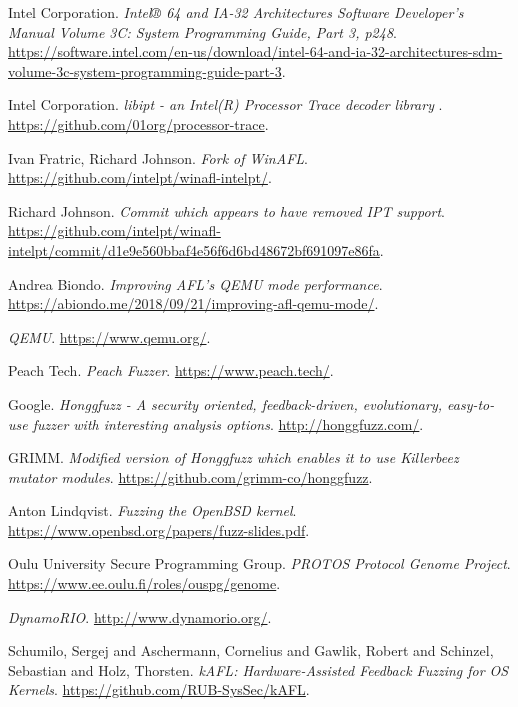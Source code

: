 \begin{thebibliography}{99}
  Intel Corporation.
  \textit{Intel® 64 and IA-32 Architectures Software Developer's Manual Volume 3C: System Programming Guide, Part 3, p248}.
  \url{https://software.intel.com/en-us/download/intel-64-and-ia-32-architectures-sdm-volume-3c-system-programming-guide-part-3}.

  Intel Corporation.
  \textit{libipt - an Intel(R) Processor Trace decoder library }.
  \url{https://github.com/01org/processor-trace}.

  Ivan Fratric, Richard Johnson.
  \textit{Fork of WinAFL}.
  \url{https://github.com/intelpt/winafl-intelpt/}.

  Richard Johnson.
  \textit{Commit which appears to have removed IPT support}.
  \url{https://github.com/intelpt/winafl-intelpt/commit/d1e9e560bbaf4e56f6d6bd48672bf691097e86fa}.

  Andrea Biondo.
  \textit{Improving AFL's QEMU mode performance}.
  \url{https://abiondo.me/2018/09/21/improving-afl-qemu-mode/}.

  \textit{QEMU}.
  \url{https://www.qemu.org/}.

  Peach Tech.
  \textit{Peach Fuzzer}.
  \url{https://www.peach.tech/}.

  Google.
  \textit{Honggfuzz - A security oriented, feedback-driven, evolutionary, easy-to-use fuzzer with interesting analysis options}.
  \url{http://honggfuzz.com/}.

  GRIMM.
  \textit{Modified version of Honggfuzz which enables it to use Killerbeez mutator modules}.
  \url{https://github.com/grimm-co/honggfuzz}.

  Anton Lindqvist.
  \textit{Fuzzing the OpenBSD kernel}.
  \url{https://www.openbsd.org/papers/fuzz-slides.pdf}.

  Oulu University Secure Programming Group.
  \textit{PROTOS Protocol Genome Project}.
  \url{https://www.ee.oulu.fi/roles/ouspg/genome}.

  \textit{DynamoRIO}.
  \url{http://www.dynamorio.org/}.

  Schumilo, Sergej and Aschermann, Cornelius and Gawlik, Robert and Schinzel, Sebastian and Holz, Thorsten.
  \textit{kAFL: Hardware-Assisted Feedback Fuzzing for OS Kernels}.
  \url{https://github.com/RUB-SysSec/kAFL}.


\end{thebibliography}
